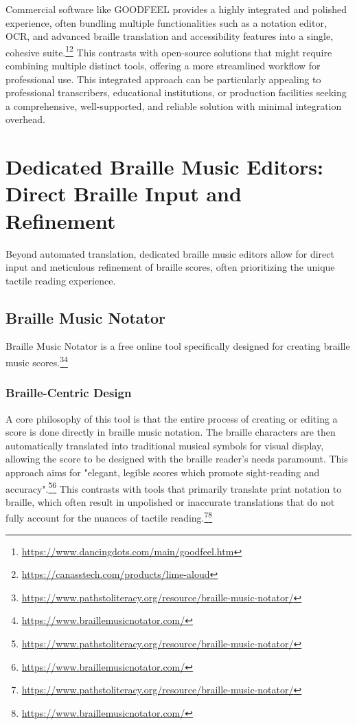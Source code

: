 Commercial software like GOODFEEL provides a highly integrated and polished experience, often bundling multiple functionalities such as a notation editor, OCR, and advanced braille translation and accessibility features into a single, cohesive suite.\footnote{\url{https://www.dancingdots.com/main/goodfeel.htm}}\footnote{\url{https://canasstech.com/products/lime-aloud}} This contrasts with open-source solutions that might require combining multiple distinct tools, offering a more streamlined workflow for professional use. This integrated approach can be particularly appealing to professional transcribers, educational institutions, or production facilities seeking a comprehensive, well-supported, and reliable solution with minimal integration overhead.

\section{Dedicated Braille Music Editors: Direct Braille Input and Refinement}

Beyond automated translation, dedicated braille music editors allow for direct input and meticulous refinement of braille scores, often prioritizing the unique tactile reading experience.

\subsection{Braille Music Notator}
Braille Music Notator is a free online tool specifically designed for creating braille music scores.\footnote{\url{https://www.pathstoliteracy.org/resource/braille-music-notator/}}\footnote{\url{https://www.braillemusicnotator.com/}}

\subsubsection{Braille-Centric Design}
A core philosophy of this tool is that the entire process of creating or editing a score is done directly in braille music notation. The braille characters are then automatically translated into traditional musical symbols for visual display, allowing the score to be designed with the braille reader's needs paramount. This approach aims for "elegant, legible scores which promote sight-reading and accuracy".\footnote{\url{https://www.pathstoliteracy.org/resource/braille-music-notator/}}\footnote{\url{https://www.braillemusicnotator.com/}} This contrasts with tools that primarily translate print notation to braille, which often result in unpolished or inaccurate translations that do not fully account for the nuances of tactile reading.\footnote{\url{https://www.pathstoliteracy.org/resource/braille-music-notator/}}\footnote{\url{https://www.braillemusicnotator.com/}}

